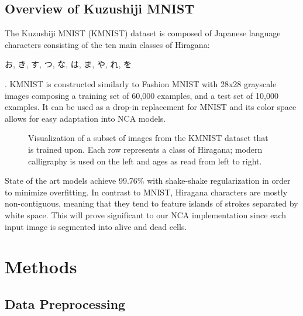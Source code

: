 \documentclass[conference]{IEEEtran}
\begin{document}
\subsection{Overview of Kuzushiji MNIST}

The Kuzushiji MNIST (KMNIST) dataset is composed of Japanese language characters consisting of the ten main classes of Hiragana: \begin{CJK}{UTF8}{min} お, き, す, つ, な, は, ま, や, れ, を \end{CJK}. \cite{kmnist} KMNIST is constructed similarly to Fashion MNIST with 28x28 grayscale images composing a training set of 60,000 examples, and a test set of 10,000 examples. It can be used as a drop-in replacement for MNIST and its color space allows for easy adaptation into NCA models.

\begin{figure}[htbp]
\caption{ Visualization of a subset of images from the KMNIST dataset that is trained upon. Each row represents a class of Hiragana; modern calligraphy is used on the left and ages as read from left to right.} 
\end{figure}

State of the art models \cite{kmnistsota} achieve 99.76\% with shake-shake regularization in order to minimize overfitting. In contrast to MNIST, Hiragana characters are mostly non-contiguous, meaning that they tend to feature islands of strokes separated by white space. This will prove significant to our NCA implementation since each input image is segmented into alive and dead cells.

\section{Methods}

\subsection{Data Preprocessing}
\end{document}
